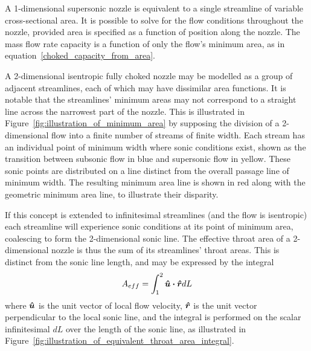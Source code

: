 \documentclass[a4paper, 11pt, oneside]{report}
\begin{document}


A 1-dimensional supersonic nozzle is equivalent to a single streamline of variable cross-sectional area. It is possible to solve for the flow conditions throughout the nozzle, provided area is specified as a function of position along the nozzle. The mass flow rate capacity is a function of only the flow's minimum area, as in equation~\ref{choked_capacity_from_area}.

A 2-dimensional isentropic fully choked nozzle may be modelled as a group of adjacent streamlines, each of which may have dissimilar area functions. It is notable that the streamlines' minimum areas may not correspond to a straight line across the narrowest part of the nozzle. This is illustrated in Figure~\ref{fig:illustration_of_minimum_area} by supposing the division of a 2-dimensional flow into a finite number of streams of finite width. Each stream has an individual point of minimum width where sonic conditions exist, shown as the transition between subsonic flow in blue and supersonic flow in yellow. These sonic points are distributed on a line distinct from the overall passage line of minimum width. The resulting minimum area line is shown in red along with the geometric minimum area line, to illustrate their disparity.

If this concept is extended to infinitesimal streamlines (and the flow is isentropic) each streamline will experience sonic conditions at its point of minimum area, coalescing to form the 2-dimensional sonic line. The effective throat area of a 2-dimensional nozzle is thus the sum of its streamlines' throat areas. This is distinct from the sonic line length, and may be expressed by the integral
\begin{equation}\label{effective_throat_area_integral}
	A_{eff} = 
	\int_{1}^2 \vu*{u} \vdot \vu*{r} dL
\end{equation}
where $\vu*{u}$ is the unit vector of local flow velocity, $\vu*{r}$ is the unit vector perpendicular to the local sonic line, and the integral is performed on the scalar infinitesimal $dL$ over the length of the sonic line, as illustrated in Figure~\ref{fig:illustration_of_equivalent_throat_area_integral}.
 		
\end{document}
